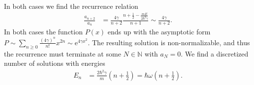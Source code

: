 \documentclass[english, parskip=full]{scrartcl}
\newcommand{\kla}{}
\newcommand{\klam}{}
\newcommand{\e}{\text{e}}
\begin{document}
In both cases we find the recurrence relation 
\begin{align}
\frac{a_{n+2}}{a_n} &= \frac{4\gamma}{n+2} \frac{ n + \frac{1}{2} - \frac{mE}{2\hbar^2\gamma}}{n+1} \sim \frac{4\gamma}{n+2}.
\end{align}
In both cases the function $P(x)$ ends up with the asymptotic form $P\sim \sum_{n\ge 0} \frac{(4\gamma)^n}{n!} x^{2n} \sim \e^{4\gamma x^2}$.
The resulting solution is non-normalizable, and thus the recurrence must terminate at some $N\in\mathbb{N}$ with $a_N = 0$.
We find a discretized number of solutions with energies
\begin{align}
E_n &= \frac{2\hbar^2\gamma}{m} \kla\left( n + \frac{1}{2} \right) = \hbar\omega \kla\left( n + \frac{1}{2} \right).
\end{align}
\end{document}
